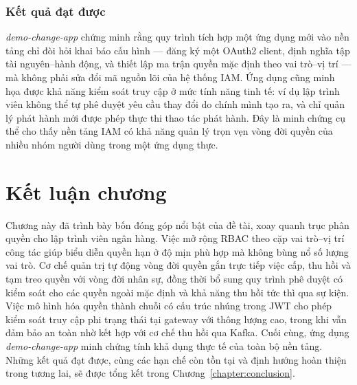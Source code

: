 \documentclass[../DoAn.tex]{subfiles}
\begin{document}
\subsubsection*{Kết quả đạt được}

\textit{demo-change-app} chứng minh rằng quy trình tích hợp một ứng dụng mới vào nền tảng chỉ đòi hỏi khai báo cấu hình --- đăng ký một OAuth2 client, định nghĩa tập tài nguyên--hành động, và thiết lập ma trận quyền mặc định theo vai trò--vị trí --- mà không phải sửa đổi mã nguồn lõi của hệ thống IAM. Ứng dụng cũng minh họa được khả năng kiểm soát truy cập ở mức tính năng tinh tế: ví dụ lập trình viên không thể tự phê duyệt yêu cầu thay đổi do chính mình tạo ra, và chỉ quản lý phát hành mới được phép thực thi thao tác phát hành. Đây là minh chứng cụ thể cho thấy nền tảng IAM có khả năng quản lý trọn vẹn vòng đời quyền của nhiều nhóm người dùng trong một ứng dụng thực.

\section{Kết luận chương}
\label{section:5.5}

Chương này đã trình bày bốn đóng góp nổi bật của đề tài, xoay quanh trục phân quyền cho lập trình viên ngân hàng. Việc mở rộng RBAC theo cặp vai trò--vị trí công tác giúp biểu diễn quyền hạn ở độ mịn phù hợp mà không bùng nổ số lượng vai trò. Cơ chế quản trị tự động vòng đời quyền gắn trực tiếp việc cấp, thu hồi và tạm treo quyền với vòng đời nhân sự, đồng thời bổ sung quy trình phê duyệt có kiểm soát cho các quyền ngoài mặc định và khả năng thu hồi tức thì qua sự kiện. Việc mô hình hóa quyền thành chuỗi có cấu trúc nhúng trong JWT cho phép kiểm soát truy cập phi trạng thái tại gateway với thông lượng cao, trong khi vẫn đảm bảo an toàn nhờ kết hợp với cơ chế thu hồi qua Kafka. Cuối cùng, ứng dụng \textit{demo-change-app} minh chứng tính khả dụng thực tế của toàn bộ nền tảng. Những kết quả đạt được, cùng các hạn chế còn tồn tại và định hướng hoàn thiện trong tương lai, sẽ được tổng kết trong Chương~\ref{chapter:conclusion}.
\end{document}
